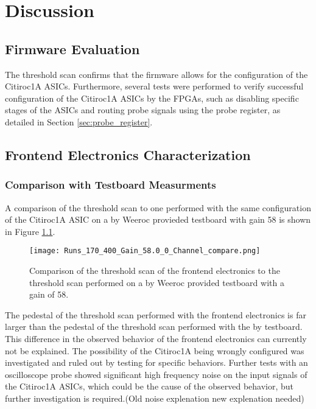 \chapter{Discussion}\label{cha: discussion}
\noindent
\section{Firmware Evaluation}
The threshold scan confirms that the firmware allows for the configuration of the Citiroc1A ASICs.
\newline
Furthermore, several tests were performed to verify successful configuration of the Citiroc1A ASICs by the FPGAs,
such as disabling specific stages of the ASICs and routing probe signals using the probe register, as detailed in Section \ref{sec:probe_register}.
\section{Frontend Electronics Characterization}
\subsection{Comparison with Testboard Measurments} 
A comparison of the threshold scan to one performed with the same configuration of the Citiroc1A ASIC on a by Weeroc provieded testboard with gain 58 is shown in Figure \ref{fig:threshold_scan_comparison_58}.%
\begin{figure}[H]
    \centering
    \texttt{[image: Runs\_170\_400\_Gain\_58.0\_0\_Channel\_compare.png]}
    \caption{Comparison of the threshold scan of the frontend electronics to the threshold scan performed on a by Weeroc provided testboard with a gain of 58.}
    \label{fig:threshold_scan_comparison_58}
\end{figure}

The pedestal of the threshold scan performed with the frontend electronics is far larger than the pedestal of the threshold scan performed with the by testboard.
This difference in the observed behavior of the frontend electronics can currently not be explained.
The possibility of the Citiroc1A being wrongly configured was investigated and ruled out by testing for specific behaviors.
Further tests with an oscilloscope probe showed significant high frequency noise on the input signals of the Citiroc1A ASICs,
which could be the cause of the observed behavior, but further investigation is required.(Old noise explenation new explenation needed)

